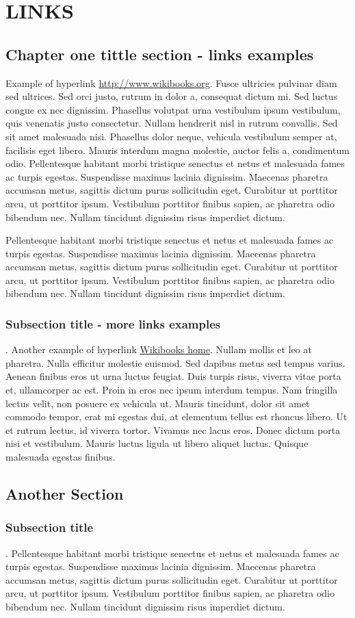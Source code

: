 \chapter{LINKS}
\section{Chapter one tittle section - links examples}
Example of hyperlink \url{http://www.wikibooks.org}. Fusce ultricies pulvinar diam sed ultrices. Sed orci justo, rutrum in dolor a, consequat dictum mi. Sed luctus congue ex nec dignissim. Phasellus volutpat urna vestibulum ipsum vestibulum, quis venenatis justo consectetur. Nullam hendrerit nisl in rutrum convallis. Sed sit amet malesuada nisi. Phasellus dolor neque, vehicula vestibulum semper at, facilisis eget libero. Mauris interdum magna molestie, auctor felis a, condimentum odio. Pellentesque habitant morbi tristique senectus et netus et malesuada fames ac turpis egestas. Suspendisse maximus lacinia dignissim. Maecenas pharetra accumsan metus, sagittis dictum purus sollicitudin eget. Curabitur ut porttitor arcu, ut porttitor ipsum. Vestibulum porttitor finibus sapien, ac pharetra odio bibendum nec. Nullam tincidunt dignissim risus imperdiet dictum.

Pellentesque habitant morbi tristique senectus et netus et malesuada fames ac turpis egestas. Suspendisse maximus lacinia dignissim. Maecenas pharetra accumsan metus, sagittis dictum purus sollicitudin eget. Curabitur ut porttitor arcu, ut porttitor ipsum. Vestibulum porttitor finibus sapien, ac pharetra odio bibendum nec. Nullam tincidunt dignissim risus imperdiet dictum.
\subsection{Subsection title - more links examples}.
Another example of hyperlink \href{http://www.wikibooks.org}{Wikibooks home}. Nullam mollis et leo at pharetra. Nulla efficitur molestie euismod. Sed dapibus metus sed tempus varius. Aenean finibus eros ut urna luctus feugiat. Duis turpis risus, viverra vitae porta et, ullamcorper ac est. Proin in eros nec ipsum interdum tempus. Nam fringilla lectus velit, non posuere ex vehicula ut. Mauris tincidunt, dolor sit amet commodo tempor, erat mi egestas dui, at elementum tellus est rhoncus libero. Ut et rutrum lectus, id viverra tortor. Vivamus nec lacus eros. Donec dictum porta nisi et vestibulum. Mauris luctus ligula ut libero aliquet luctus. Quisque malesuada egestas finibus.

\section{Another Section}
\subsection{Subsection title}.
Pellentesque habitant morbi tristique senectus et netus et malesuada fames ac turpis egestas. Suspendisse maximus lacinia dignissim. Maecenas pharetra accumsan metus, sagittis dictum purus sollicitudin eget. Curabitur ut porttitor arcu, ut porttitor ipsum. Vestibulum porttitor finibus sapien, ac pharetra odio bibendum nec. Nullam tincidunt dignissim risus imperdiet dictum.